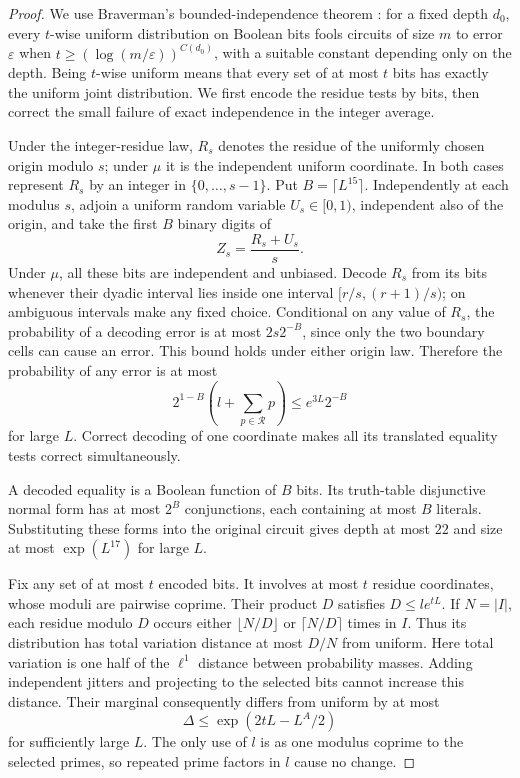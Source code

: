 \begin{proof}
We use Braverman's bounded-independence theorem
\cite[Corollary~2]{Braverman10}: for a fixed depth $d_0$, every
$t$-wise uniform distribution on Boolean bits fools circuits of
size $m$ to error $\varepsilon$ when
$t\ge(\log(m/\varepsilon))^{C(d_0)}$, with a suitable constant
depending only on the depth.  Being $t$-wise uniform means that every
set of at most $t$ bits has exactly the uniform joint distribution.
We first encode the residue tests by bits, then correct the small
failure of exact independence in the integer average.

Under the integer-residue law, $R_s$ denotes the residue of the
uniformly chosen origin modulo $s$; under $\mu$ it is the independent
uniform coordinate. In both cases represent $R_s$ by an integer in
$\{0,\ldots,s-1\}$. Put $B=\lceil L^{15}\rceil$. Independently at each modulus $s$,
adjoin a uniform random variable $U_s\in[0,1)$, independent also of
the origin, and take the first $B$ binary digits of
\[
                   Z_s=\frac{R_s+U_s}{s}.
\]
Under $\mu$, all these bits are independent and unbiased.  Decode
$R_s$ from its bits whenever their dyadic interval lies inside one
interval $[r/s,(r+1)/s)$; on ambiguous intervals make any fixed choice.
Conditional on any value of $R_s$, the probability of a decoding
error is at most $2s2^{-B}$, since only the two boundary cells can
cause an error.  This bound holds under either origin law.  Therefore
the probability of any error is at most
\begin{equation}\label{q:decoding-error}
 2^{1-B}\left(l+\sum_{p\in\mathcal R}p\right)
                 \le e^{3L}2^{-B}
\end{equation}
for large $L$.  Correct decoding of one coordinate makes all its
translated equality tests correct simultaneously.

A decoded equality is a Boolean function of $B$ bits.  Its
truth-table disjunctive normal form has at most $2^B$ conjunctions,
each containing at most $B$ literals.  Substituting these forms into
the original circuit gives depth at most $22$ and size at most
$\exp(L^{17})$ for large $L$.

Fix any set of at most $t$ encoded bits.  It involves at most $t$
residue coordinates, whose moduli are pairwise coprime.  Their
product $D$ satisfies $D\le l e^{tL}$.  If $N=|I|$, each residue
modulo $D$ occurs either $\lfloor N/D\rfloor$ or $\lceil N/D\rceil$
times in $I$.  Thus its distribution has total variation distance
at most $D/N$ from uniform.  Here total variation is one half of
the $\ell^1$ distance between probability masses.  Adding independent
jitters and projecting to the selected bits cannot increase this
distance.  Their marginal consequently differs from uniform by at
most
\begin{equation}\label{q:crt-bits}
 \Delta\le \exp(2tL-L^A/2)
\end{equation}
for sufficiently large $L$.  The only use of $l$ is as one modulus
coprime to the selected primes, so repeated prime factors in $l$
cause no change.


\end{proof}
